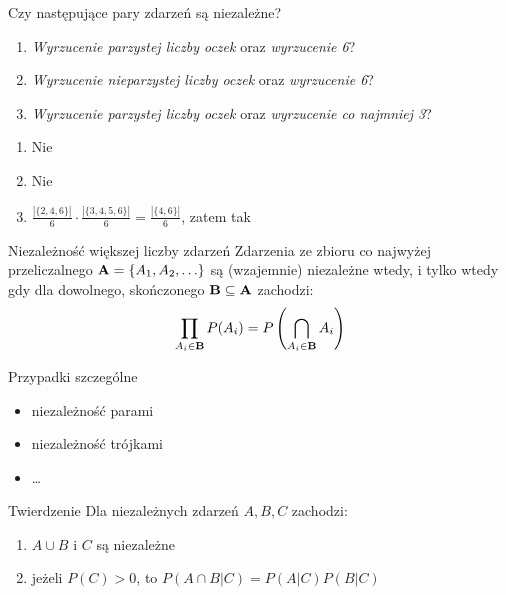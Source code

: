 \documentclass{mp}
\begin{document}
\begin{frame}{Czy następujące pary zdarzeń są niezależne?}
\begin{center}
\end{center}

\begin{enumerate}
\item \emph{Wyrzucenie parzystej liczby oczek} oraz \emph{wyrzucenie 6}?
\item \emph{Wyrzucenie nieparzystej liczby oczek} oraz \emph{wyrzucenie 6}?
\item \emph{Wyrzucenie parzystej liczby oczek} oraz \emph{wyrzucenie co najmniej 3}?
\end{enumerate}
{
\begin{enumerate}
\item Nie
\item Nie
\item $\frac{\left|\{2,4,6\}\right|}{6}\cdot \frac{\left|\{3,4,5,6\}\right|}{6}=\frac{\left|\{4,6\}\right|}{6}$, zatem tak
\end{enumerate}
}
\end{frame}
\begin{frame}{Niezależność większej liczby zdarzeń}
Zdarzenia ze zbioru co najwyżej przeliczalnego $\mathbf{A}=\{A_1, A_2, \ldots\}$ są (wzajemnie) niezależne wtedy, i tylko wtedy gdy dla dowolnego, skończonego $\mathbf{B}\subseteq \mathbf{A}$ zachodzi:
\[ \prod_{A_i\in \mathbf{B}} P(A_i)=P\left(\bigcap_{A_i\in \mathbf{B}}A_i\right)\]
{
	\begin{block}{Przypadki szczególne}
	\begin{itemize}
	\item niezależność parami
	\item niezależność trójkami
	\item \ldots
	\end{itemize}
	\end{block}
}
{
	\begin{block}{Twierdzenie}
	Dla niezależnych zdarzeń $A, B, C$ zachodzi:
	\begin{enumerate}
	\item $A\cup B$ i $C$ są niezależne
	\item jeżeli $P(C)>0$, to $P(A\cap B|C)=P(A|C)P(B|C)$
	\end{enumerate}
	\end{block}
}
\end{frame}
\end{document}
